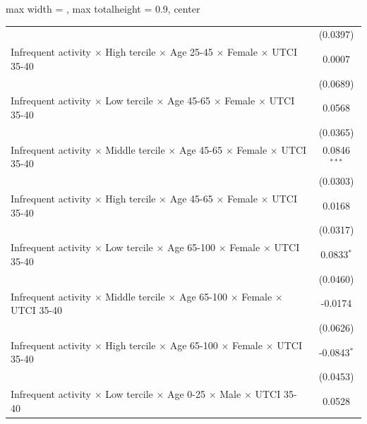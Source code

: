 \begin{table}[htbp]
\begin{adjustbox}{max width = \textwidth, max totalheight = 0.9\textheight, center}
\begin{tabular}{lc}
                                                                                                                 & (0.0397)\\   
         Infrequent activity $\times$ High tercile $\times$ Age 25-45 $\times$ Female $\times$ UTCI 35-40        & 0.0007\\   
                                                                                                                 & (0.0689)\\   
         Infrequent activity $\times$ Low tercile $\times$ Age 45-65 $\times$ Female $\times$ UTCI 35-40         & 0.0568\\   
                                                                                                                 & (0.0365)\\   
         Infrequent activity $\times$ Middle tercile $\times$ Age 45-65 $\times$ Female $\times$ UTCI 35-40      & 0.0846$^{***}$\\   
                                                                                                                 & (0.0303)\\   
         Infrequent activity $\times$ High tercile $\times$ Age 45-65 $\times$ Female $\times$ UTCI 35-40        & 0.0168\\   
                                                                                                                 & (0.0317)\\   
         Infrequent activity $\times$ Low tercile $\times$ Age 65-100 $\times$ Female $\times$ UTCI 35-40        & 0.0833$^{*}$\\   
                                                                                                                 & (0.0460)\\   
         Infrequent activity $\times$ Middle tercile $\times$ Age 65-100 $\times$ Female $\times$ UTCI 35-40     & -0.0174\\   
                                                                                                                 & (0.0626)\\   
         Infrequent activity $\times$ High tercile $\times$ Age 65-100 $\times$ Female $\times$ UTCI 35-40       & -0.0843$^{*}$\\   
                                                                                                                 & (0.0453)\\   
         Infrequent activity $\times$ Low tercile $\times$ Age 0-25 $\times$ Male $\times$ UTCI 35-40            & 0.0528\\   

\end{tabular}
\end{adjustbox}
\end{table}
